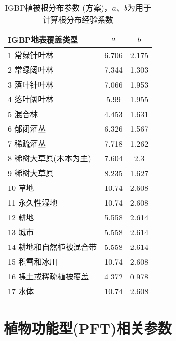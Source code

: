 \begin{table}[htbp]
  \centering
  \caption[IGBP植被根分布参数 (\citet{zeng2001global}方案)]{IGBP植被根分布参数 (\citet{zeng2001global}方案)，$a$、$b$为用于计算根分布经验系数}
  \label{tab:IGBP植被根分布参数zeng方案}
  \begin{tabular}{@{}lcc@{}}
    \toprule
    IGBP地表覆盖类型        & $a$   & $b$   \\ \midrule
    1 常绿针叶林            & 6.706 & 2.175 \\
    2 常绿阔叶林            & 7.344 & 1.303 \\
    3 落叶针叶林            & 7.066 & 1.953 \\
    4 落叶阔叶林            & 5.99  & 1.955 \\
    5 混合林                & 4.453 & 1.631 \\
    6 郁闭灌丛              & 6.326 & 1.567 \\
    7 稀疏灌丛              & 7.718 & 1.262 \\
    8 稀树大草原(木本为主)  & 7.604 & 2.3   \\
    9 稀树大草原            & 8.235 & 1.627 \\
    10 草地                 & 10.74 & 2.608 \\
    11 永久性湿地           & 10.74 & 2.608 \\
    12 耕地                 & 5.558 & 2.614 \\
    13 城市                 & 5.558 & 2.614 \\
    14 耕地和自然植被混合带 & 5.558 & 2.614 \\
    15 积雪和冰川           & 10.74 & 2.608 \\
    16 裸土或稀疏植被覆盖   & 4.372 & 0.978 \\
    17 水体                 & 10.74 & 2.608 \\ \bottomrule
  \end{tabular}
\end{table}


\chapter{植物功能型(PFT)相关参数}\label{植物功能型PFT相关参数}

